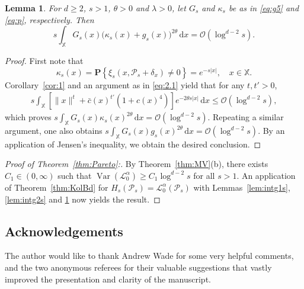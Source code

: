 \documentclass[11pt,reqno]{amsart}
\numberwithin{equation}{section}
\newtheorem{lemma}[theorem]{Lemma}
\theoremstyle{definition}
\newcommand{\sP}{\mathcal{P}}
\newcommand{\Prob}[1]{\mathbf P\left\{#1\right\}}
\newcommand{\XX}{\mathbb{X}}
\newcommand{\diff}{{\,\mathrm d}}
\DeclareMathOperator{\Var}{Var}
\begin{document}
\begin{lemma}\label{lem:qgint} 
	For $d \ge 2$, $s>1$, $\theta>0$ and $\lambda>0$, let $G_s$ and $\kappa_s$ be as in
	\eqref{eq:g5} and \eqref{eq:p}, respectively. Then
	\begin{displaymath}
	s\int_\XX G_s(x)\big(\kappa_s(x)+g_{s}(x)\big)^{2\theta} \diff x
	=\mathcal{O}(\log^{d-2} s).
	\end{displaymath}
\end{lemma}

\begin{proof}
	First note that
	\begin{displaymath}
	\kappa_s(x)=\Prob{\xi_{s}(x, \sP_{s}+\delta_x)\neq 0}=e^{-s |x|}, \quad x \in \XX.
	\end{displaymath}
	Corollary~\ref{cor:1} and an argument as in \eqref{eq:2.1} yield that for any $t,t'>0$,
	\begin{align*}
	s \int_\XX
	\left[\|x\|^{t} + \bar c (x)^{t'} (1+c(x)^4)\right] e^{-2\theta s |x|} \diff x
	\le \mathcal{O}(\log^{d-2} s),
	\end{align*}
	which proves $s\int_\XX G_s(x)\kappa_s(x)^{2\theta} \diff x=\mathcal{O}(\log^{d-2} s)$.
	Repeating a similar argument, one also obtains
 	 $s\int_\XX G_s(x) g_{s}(x)^{2\theta} \diff x=\mathcal{O}(\log^{d-2} s)$. By an application of Jensen's inequality, we obtain the desired conclusion.
\end{proof}

\begin{proof}[Proof of Theorem~\ref{thm:Pareto}:] 
	By Theorem~\ref{thm:MV}(b), there exists $C_1 \in (0,\infty)$ such that $\Var(\mathscr{L}_0^{\alpha}) \ge C_1 \log^{d-2} s$ for all
	$s > 1$. An application of Theorem~\ref{thm:KolBd} for $H_s(\sP_s)=\mathscr{L}_0^\alpha(\sP_s)$ with
	Lemmas~\ref{lem:intg1s}, \ref{lem:intg2s} and \ref{lem:qgint} now
	yields the result.
\end{proof}


\subsection*{Acknowledgements} The author would like to thank Andrew Wade for some very helpful comments, and the two anonymous referees for their valuable suggestions that vastly improved the presentation and clarity of the manuscript.



\end{document}
